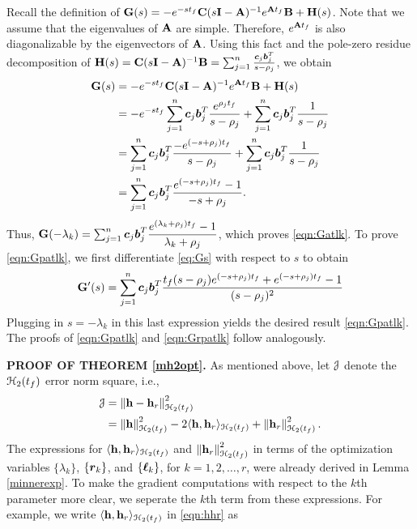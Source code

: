 \documentclass[twocolumn]{autart}
\begin{document}
\begin{pf}
Recall the definition of $\mathbf{G}(s) = -e^{-st_f}\mathbf{C}(s\mathbf{I}-\mathbf{A})^{-1}e^{\mathbf{A} t_f}\mathbf{B}+\mathbf{H}(s)$. Note that we assume that the eigenvalues of $\mathbf{A}$ are simple. Therefore, $e^{\mathbf{A} t_f}$ is also diagonalizable by the eigenvectors of $\mathbf{A}$. Using this fact and the pole-zero residue decomposition of   $\mathbf{H}(s) = \mathbf{C}(s\mathbf{I}-\mathbf{A})^{-1} \mathbf{B} = \sum_{j=1}^n \frac{\boldsymbol{c}_j \boldsymbol{b}_j^T}{s-\rho_j}$, we obtain 
\begin{align}
\mathbf{G}(s) &= -e^{-st_f}\mathbf{C}(s\mathbf{I}-\mathbf{A})^{-1}e^{\mathbf{A} t_f}\mathbf{B}+\mathbf{H}(s)  \nonumber \\ 
&=-e^{-s{t_f}}\sum_{j=1}^n\boldsymbol{c}_j\boldsymbol{b}_j^T\dfrac{e^{\rho_jt_f}}{s-\rho_j}+\sum_{j=1}^n\boldsymbol{c}_j\boldsymbol{b}_j^T\dfrac{1}{s-\rho_j}\\
&=\sum_{j=1}^n\boldsymbol{c}_j\boldsymbol{b}_j^T\dfrac{-e^{(-s + \rho_j){t_f}}}{s-\rho_j}+\sum_{j=1}^n\boldsymbol{c}_j\boldsymbol{b}_j^T\dfrac{1}{s-\rho_j} \nonumber\\
&=\sum_{j=1}^n\boldsymbol{c}_j\boldsymbol{b}_j^T\dfrac{e^{(-s+\rho_j)t_f}-1}{-s+\rho_j}. \label{eq:Gs}
\end{align}
Thus,
$\mathbf{G}(-\lambda_k)=\sum_{j=1}^n\boldsymbol{c}_j\boldsymbol{b}_j^T\dfrac{e^{(\lambda_k+\rho_j){t_f}}-1}{\lambda_k+\rho_j}$,
which proves \eqref{eqn:Gatlk}. To prove \eqref{eqn:Gpatlk}, we first differentiate \eqref{eq:Gs} with respect to $s$ to obtain
 \begin{align*}
 \mathbf{G}'(s) =\sum_{j=1}^n\boldsymbol{c}_j\boldsymbol{b}_j^T\dfrac {{t_f} (s-\rho_j)e^{(-s+\rho_j){t_f}}+e^{(-s+\rho_j){t_f}}-1}{(s-\rho_j)^2}
 \end{align*}
 Plugging in $s= -\lambda_k$ in this last expression yields the desired result \eqref{eqn:Gpatlk}. The proofs of
 \eqref{eqn:Gpatlk} and \eqref{eqn:Grpatlk} follow analogously. 
\end{pf}%
\textbf{{PROOF OF THEOREM \ref{mh2opt}.}}
 As mentioned above, let $\EuScript{J}$ denote the $\EuScript{H}_2({t_f})$ error norm square, i.e., 
\begin{align*}
 \EuScript{J}&=\left\lVert\mathbf{h} -\mathbf{h}_r\right\rVert^2_{\EuScript{H}_2({t_f})} \\
&=\left\lVert\mathbf{h}\right\rVert_{\EuScript{H}_2({t_f})}^2-2 \langle\mathbf{h}, \mathbf{h}_r\rangle_{\EuScript{H}_2({t_f})}+\left\lVert\mathbf{h}_r\right\rVert_{\EuScript{H}_2({t_f})}^2.
\end{align*}
The expressions for $ \langle\mathbf{h}, \mathbf{h}_r\rangle_{\EuScript{H}_2({t_f})}$ and $\left\lVert\mathbf{h}_r\right\rVert_{\EuScript{H}_2({t_f})}^2$ in terms of the optimization variables $\{\lambda_k\}$, $\{\boldsymbol{r}_k\}$, and $\{\boldsymbol{\ell}_k\}$, for $k=1,2,\ldots,r$, were already derived in Lemma \eqref{minnerexp}. To make the gradient computations with respect to the $k$th parameter more clear, we seperate the $k$th term from these expressions. For example, we write $\langle\mathbf{h}, \mathbf{h}_r\rangle_{\EuScript{H}_2({t_f})}$ in \eqref{eqn:hhr} as
\end{document}
